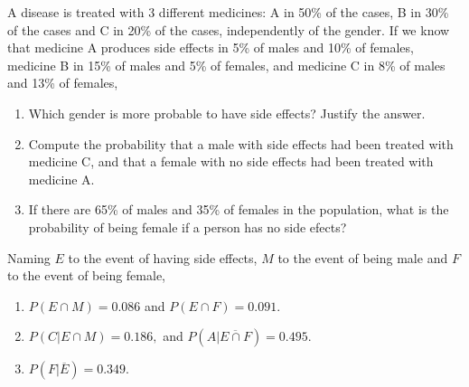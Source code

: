 {A disease is treated with 3 different medicines: A in 50\% of the cases, B in 30\% of the cases and C in 20\% of the cases, independently of the gender. 
If we know that medicine A produces side effects in 5\% of males and 10\% of females, medicine B
in 15\% of males and 5\% of females, and medicine C in 8\% of males and 13\% of females,
\begin{enumerate}
\item Which gender is more probable to have side effects? Justify the answer.
\item Compute the probability that a male with side effects had been treated with medicine C, and that a female with no side effects had been treated with medicine A.
\item If there are 65\% of males and 35\% of females in the population, what is the probability of being female if a person has no side efects?
\end{enumerate}
}
{Naming $E$ to the event of having side effects, $M$ to the event of being male and $F$ to the event of being female,
\begin{enumerate}
\item $P(E\cap M)=0.086$ and $P(E\cap F)=0.091$.
\item $P(C|E\cap M)=0.186,$ and $P(A|\overline{E\cap F})=0.495$.
\item $P(F|\overline E)= 0.349$.
\end{enumerate}
}
